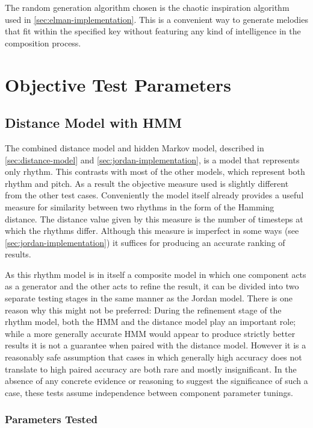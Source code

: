 \documentclass[ author={Stephen Livermore-Tozer},
				supervisor={Dr. Peter Flach},
				degree={MEng},
				title={Algorithmic Co-composition Using Machine Learning},
				subtitle={},
				type={research},
				year={2016} ]{dissertation}
\begin{document}
	The random generation algorithm chosen is the chaotic inspiration algorithm used in \ref{sec:elman-implementation}. This is a convenient way to generate melodies that fit within the specified key without featuring any kind of intelligence in the composition process.
	
	\section{Objective Test Parameters}
	
	\subsection{Distance Model with HMM}
	
	The combined distance model and hidden Markov model, described in \ref{sec:distance-model} and \ref{sec:jordan-implementation}, is a model that represents only rhythm. This contrasts with most of the other models, which represent both rhythm and pitch. As a result the objective measure used is slightly different from the other test cases. Conveniently the model itself already provides a useful measure for similarity between two rhythms in the form of the Hamming distance. The distance value given by this measure is the number of timesteps at which the rhythms differ. Although this measure is imperfect in some ways (see \ref{sec:jordan-implementation}) it suffices for producing an accurate ranking of results.
	
	As this rhythm model is in itself a composite model in which one component acts as a generator and the other acts to refine the result, it can be divided into two separate testing stages in the same manner as the Jordan model. There is one reason why this might not be preferred: During the refinement stage of the rhythm model, both the HMM and the distance model play an important role; while a more generally accurate HMM would appear to produce strictly better results it is not a guarantee when paired with the distance model. However it is a reasonably safe assumption that cases in which generally high accuracy does not translate to high paired accuracy are both rare and mostly insignificant. In the absence of any concrete evidence or reasoning to suggest the significance of such a case, these tests assume independence between component parameter tunings.
	
	\subsubsection{Parameters Tested}
	
\end{document}
